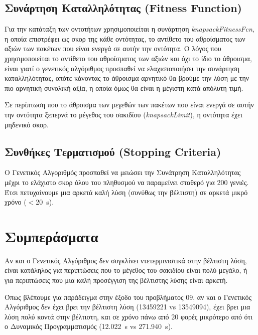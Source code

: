 \documentclass{article}
\begin{document}
\subsection{Συνάρτηση Καταλληλότητας (Fitness Function)}

Για την κατάταξη των οντοτήτων χρησιμοποιείται η συνάρτηση
\textit{knapsackFitnessFcn}, η οποία επιστρέφει ως σκορ της κάθε οντότητας, το
αντίθετο του αθροίσματος των αξιών των πακέτων που είναι ενεργά σε αυτήν την
οντότητα. Ο λόγος που χρησιμοποιείται το αντίθετο του αθροίσματος των αξιών και
όχι το ίδιο το άθροισμα, είναι γιατί ο γενετικός αλγόριθμος προσπαθεί να
ελαχιστοποιήσει την συνάρτηση καταλληλότητας, οπότε κάνοντας το άθροισμα
αρνητικό θα βρούμε την λύση με την πιο αρνητική συνολική αξία, η οποία όμως θα
είναι η μέγιστη κατά απόλυτη τιμή.

Σε περίπτωση που το άθροισμα των μεγεθών των πακέτων που είναι ενεργά σε αυτήν
την οντότητα ξεπερνά το μέγεθος του σακιδίου (\textit{knapsackLimit}), η
οντότητα έχει μηδενικό σκορ.

\subsection{Συνθήκες Τερματισμού (Stopping Criteria)}

Ο Γενετικός Αλγοριθμός προσπαθεί να μειώσει την Συνάτρηση Καταλληλότητας μέχρι
το ελάχιστο σκορ όλου του πληθυσμού να παραμείνει σταθερό για 200 γενιές. Έτσι
πετυχαίνουμε μια αρκετά καλή λύση (συνύθως την βέλτιστη) σε αρκετά μικρό χρόνο
($<$\SI{20}{\second}).

\section{Συμπεράσματα}

Αν και ο Γενετικός Αλγόριθμος δεν συγκλίνει ντετερμινιστικά στην βέλτιστη λύση,
είναι κατάληλος για περιπτώσεις που το μέγεθος του σακιδίου είναι πολύ μεγάλο, ή
για περιπτώσεις που μια καλή προσέγγιση της βέλτιστης λύσης είναι αρκετή.

Όπως βλέπουμε για παράδειγμα στην έξοδο του προβλήματος $09$, αν και ο Γενετικός
Αλγόριθμος δεν έχει βρει την βέλτιστη λύση (\num{13459221} vs \num{13549094}),
έχει βρει μια λύση πολύ κοντά στην βέλτιστη, και σε χρόνο πάνω από 20 φορές
μικρότερο από ότι ο Δυναμικός Προγραμματισμός (\SI{12.022}{\second} vs
\SI{271.940}{\second}).
\end{document}
